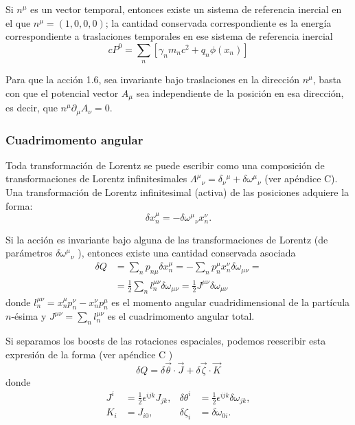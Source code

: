 Si $n^{\mu}$ es un vector temporal, entonces existe un sistema de referencia inercial en el que $n^{\mu}=(1,0,0,0)$; la cantidad conservada correspondiente es la energía correspondiente a traslaciones temporales en ese sistema de referencia inercial
$$
c P^{0}=\sum_{n}\left[\gamma_{n} m_{n} c^{2}+q_{n} \phi\left(x_{n}\right)\right]
$$

Para que la acción 1.6, sea invariante bajo traslaciones en la dirección $n^{\mu}$, basta con que el potencial vector $A_{\mu}$ sea independiente de la posición en esa dirección, es decir, que $n^{\mu} \partial_{\mu} A_{\nu}=0$.
\subsubsection{Cuadrimomento angular}
Toda transformación de Lorentz se puede escribir como una composición de transformaciones de Lorentz infinitesimales $\Lambda^{\mu}{ }_{\nu}=\delta_{\nu}{ }^{\mu}+\delta \omega^{\mu}{ }_{\nu}$ (ver apéndice C). Una transformación de Lorentz infinitesimal (activa) de las posiciones adquiere la forma:
$$
\delta x_{n}^{\mu}=-\delta \omega^{\mu}{ }_{\nu} x_{n}^{\nu} .
$$

Si la acción es invariante bajo alguna de las transformaciones de Lorentz (de parámetros $\delta \omega^{\mu}{ }_{\nu}$ ), entonces existe una cantidad conservada asociada
$$
\begin{aligned}
\delta Q & =\sum_{n} p_{n \mu} \delta x_{n}^{\mu}=-\sum_{n} p_{n}^{\mu} x_{n}^{\nu} \delta \omega_{\mu \nu}= \\
& =\frac{1}{2} \sum_{n} l_{n}^{\mu \nu} \delta \omega_{\mu \nu}=\frac{1}{2} J^{\mu \nu} \delta \omega_{\mu \nu}
\end{aligned}
$$
donde $l_{n}^{\mu \nu}=x_{n}^{\mu} p_{n}^{\nu}-x_{n}^{\nu} p_{n}^{\mu}$ es el momento angular cuadridimensional de la partícula $n$-ésima y $J^{\mu \nu}=\sum_{n} l_{n}^{\mu \nu}$ es el cuadrimomento angular total.

Si separamos los boosts de las rotaciones espaciales, podemos reescribir esta expresión de la forma (ver apéndice C )
$$
\delta Q=\delta \vec{\theta} \cdot \vec{J}+\delta \vec{\zeta} \cdot \vec{K}
$$
donde
$$
\begin{aligned}
J^{i} & =\frac{1}{2} \epsilon^{i j k} J_{j k}, & \delta \theta^{i} & =\frac{1}{2} \epsilon^{i j k} \delta \omega_{j k}, \\
K_{i} & =J_{i 0}, & \delta \zeta_{i} & =\delta \omega_{0 i} .
\end{aligned}
$$

